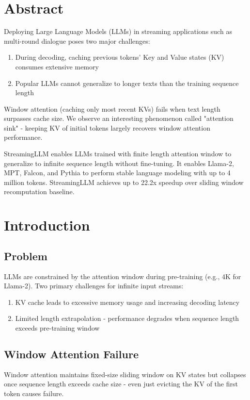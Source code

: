 
\section{Abstract}
Deploying Large Language Models (LLMs) in streaming applications such as multi-round dialogue poses two major challenges:
\begin{enumerate}
\item During decoding, caching previous tokens' Key and Value states (KV) consumes extensive memory
\item Popular LLMs cannot generalize to longer texts than the training sequence length
\end{enumerate}

Window attention (caching only most recent KVs) fails when text length surpasses cache size. We observe an interesting phenomenon called "attention sink" - keeping KV of initial tokens largely recovers window attention performance.

StreamingLLM enables LLMs trained with finite length attention window to generalize to infinite sequence length without fine-tuning. It enables Llama-2, MPT, Falcon, and Pythia to perform stable language modeling with up to 4 million tokens. StreamingLLM achieves up to 22.2x speedup over sliding window recomputation baseline.

\section{Introduction}

\subsection{Problem}
LLMs are constrained by the attention window during pre-training (e.g., 4K for Llama-2). Two primary challenges for infinite input streams:
\begin{enumerate}
\item KV cache leads to excessive memory usage and increasing decoding latency
\item Limited length extrapolation - performance degrades when sequence length exceeds pre-training window
\end{enumerate}

\subsection{Window Attention Failure}
Window attention maintains fixed-size sliding window on KV states but collapses once sequence length exceeds cache size - even just evicting the KV of the first token causes failure.

